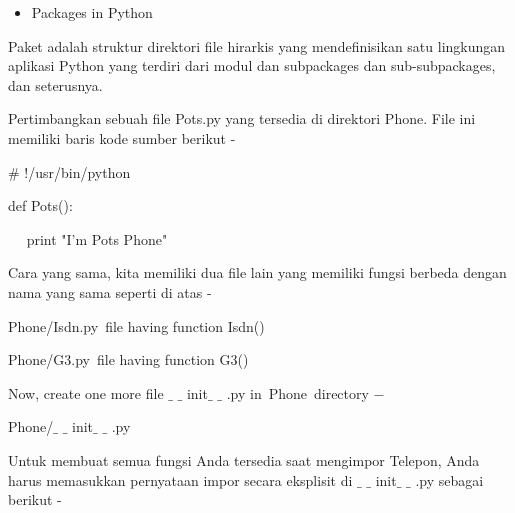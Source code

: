 \vspace{\baselineskip}
\begin{itemize}
	\item Packages in Python
\end{itemize}

\noindent Paket adalah struktur direktori file hirarkis yang mendefinisikan satu lingkungan aplikasi Python yang terdiri dari modul dan subpackages dan sub-subpackages, dan seterusnya.\par

\vspace{\baselineskip}
\noindent Pertimbangkan sebuah file Pots.py yang tersedia di direktori Phone. File ini memiliki baris kode sumber berikut -\par

\vspace{\baselineskip}
\noindent \hspace*{0.5in}$\#$ !/usr/bin/python\par


\noindent \hspace*{0.5in}def Pots():\par


\noindent \hspace*{0.5in}~~ print "I'm Pots Phone"\par


\vspace{\baselineskip}
\noindent Cara yang sama, kita memiliki dua file lain yang memiliki fungsi berbeda dengan nama yang sama seperti di atas -\par
\vspace{\baselineskip}
\noindent Phone/Isdn.py file having function Isdn()\par
\vspace{\baselineskip}
\noindent Phone/G3.py file having function G3()\par

\vspace{\baselineskip}
\noindent Now, create one more file $ \_ $ $ \_ $ init$ \_ $ $ \_ $ .py in Phone directory $-$ \par


\noindent Phone/$ \_ $ $ \_ $ init$ \_ $ $ \_ $ .py\par

\vspace{\baselineskip}
\noindent Untuk membuat semua fungsi Anda tersedia saat mengimpor Telepon, Anda harus memasukkan pernyataan impor secara eksplisit di $ \_ $ $ \_ $ init$ \_ $ $ \_ $ .py sebagai berikut -\par

